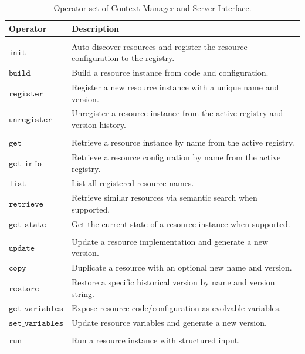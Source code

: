 \begin{table}[h]
\centering
\small
\caption{Operator set of Context Manager and Server Interface.}
\label{appx_tab:context-manager-interface}
\begin{tabular}{p{2.5cm}p{10.5cm}}
\toprule
\textbf{Operator} & \textbf{Description} \\
\midrule
\rowcolor{gray!15} \multicolumn{2}{c}{\textbf{Lifecycle \& Registration}} \\
$\mathtt{init}$ & Auto discover resources and register the resource configuration to the registry. \\
$\mathtt{build}$ & Build a resource instance from code and configuration. \\
$\mathtt{register}$ & Register a new resource instance with a unique name and version. \\
$\mathtt{unregister}$ & Unregister a resource instance from the active registry and version history. \\
\midrule
\rowcolor{gray!15} \multicolumn{2}{c}{\textbf{Retrieval \& Inspection}} \\
$\mathtt{get}$ & Retrieve a resource instance by name from the active registry. \\
$\mathtt{get\_info}$ & Retrieve a resource configuration by name from the active registry. \\
$\mathtt{list}$ & List all registered resource names. \\
$\mathtt{retrieve}$ & Retrieve similar resources via semantic search when supported. \\
$\mathtt{get\_state}$ & Get the current state of a resource instance when supported. \\
\midrule
\rowcolor{gray!15} \multicolumn{2}{c}{\textbf{Versioning}} \\
$\mathtt{update}$ & Update a resource implementation and generate a new version. \\
$\mathtt{copy}$ & Duplicate a resource with an optional new name and version. \\
$\mathtt{restore}$ & Restore a specific historical version by name and version string. \\
$\mathtt{get\_variables}$ & Expose resource code/configuration as evolvable variables. \\
$\mathtt{set\_variables}$ & Update resource variables and generate a new version. \\
\midrule
\rowcolor{gray!15} \multicolumn{2}{c}{\textbf{Execution}} \\
$\mathtt{run}$ & Run a resource instance with structured input. \\

\end{tabular}
\end{table}
